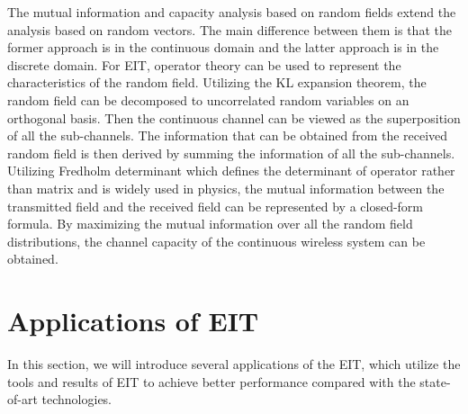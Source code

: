 \documentclass[journal,twocolumn]{IEEEtran}
\begin{document}
The mutual information and capacity analysis based on random fields extend the analysis based on random vectors. The main difference between them is that the former approach is in the continuous domain and the latter approach is in the discrete domain. For EIT, operator theory can be used to represent the characteristics of the random field. 
Utilizing the KL expansion theorem, the random field can be decomposed to uncorrelated random variables on an orthogonal basis. Then the continuous channel can be viewed as the superposition of all the sub-channels. The information that can be obtained from the received random field is then derived by summing the information of all the sub-channels. Utilizing Fredholm determinant which defines the determinant of operator rather than matrix and is widely used in physics, the mutual information between the transmitted field and the received field can be represented by a closed-form formula. By maximizing the mutual information over all the random field distributions, the channel capacity of the continuous wireless system can be obtained. 

\section{Applications of EIT}
In this section, we will introduce several applications of the EIT, which utilize the tools and results of EIT to achieve better performance compared with the state-of-art technologies.
\end{document}
